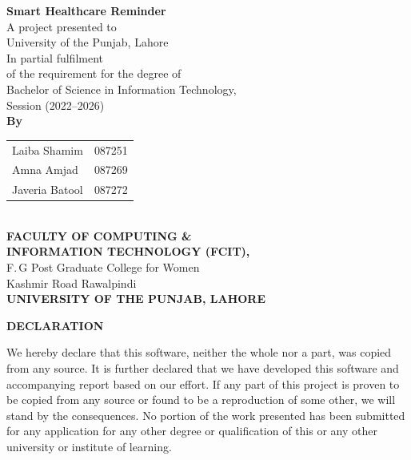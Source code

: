 \newpage
\thispagestyle{empty}
\begin{center}
\vspace*{1cm}
{\Large\bfseries Smart Healthcare Reminder}\\[0.5cm]
A project presented to\\
University of the Punjab, Lahore\\[0.5cm]
In partial fulfilment\\
of the requirement for the degree of\\[0.3cm]
{\large Bachelor of Science in Information Technology,\\
Session (2022--2026)}\\[0.5cm]
\textbf{By}\\[0.3cm]
\begin{tabular}{l l}
Laiba Shamim & 087251 \\
Amna Amjad & 087269 \\
Javeria Batool & 087272 \\
\end{tabular}\\[1cm]
\textbf{FACULTY OF COMPUTING \&\\
INFORMATION TECHNOLOGY (FCIT),}\\
F.\,G Post Graduate College for Women\\
Kashmir Road Rawalpindi\\
\textbf{UNIVERSITY OF THE PUNJAB, LAHORE}
\end{center}
\vfill

\newpage
\thispagestyle{empty}
\begin{center}
{\Large\bfseries DECLARATION}
\end{center}
\vspace{1cm}

We hereby declare that this software, neither the whole nor a part, was copied from any source. It is further declared that we have developed this software and accompanying report based on our effort. If any part of this project is proven to be copied from any source or found to be a reproduction of some other, we will stand by the consequences. No portion of the work presented has been submitted for any application for any other degree or qualification of this or any other university or institute of learning.

